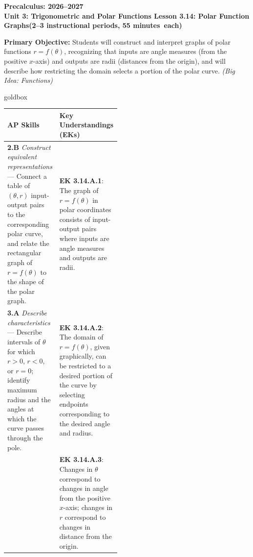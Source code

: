 \documentclass[10pt]{article}
\newcommand{\CourseName}{Precalculus}
\newcommand{\SchoolYear}{2026--2027}
\newcommand{\MeetingLength}{55 minutes}
\newcommand{\UnitNumberName}{Unit 3: Trigonometric and Polar Functions \quad}
\newcommand{\LessonNumberName}{Lesson 3.14: Polar Function Graphs}
\begin{document}
\begin{center}
  {\Large\bfseries \CourseName: \SchoolYear} \\[4pt]
  {\small\bfseries \UnitNumberName \LessonNumberName \quad (2--3 instructional periods, \MeetingLength\ each)}
\end{center}

\begin{tcolorbox}[colback=sky, colframe=navy, boxrule=0.9pt, arc=2mm,
    left=2mm, right=2mm, top=1.5mm, bottom=1.5mm]
  \textbf{Primary Objective:} Students will construct and interpret graphs of polar
  functions $r = f(\theta)$, recognizing that inputs are angle measures (from the
  positive $x$-axis) and outputs are radii (distances from the origin), and will
  describe how restricting the domain selects a portion of the polar curve.
  \textit{(Big Idea: Functions)}
\end{tcolorbox}

\vspace{0.08in}

\begin{skillbox}{goldbox}
\begin{tabularx}{\linewidth}{@{} p{0.46\linewidth} X @{}}
\textbf{AP Skills} & \textbf{Key Understandings (EKs)} \\
\midrule
\textbf{2.B} \textit{Construct equivalent representations} ---
  Connect a table of $(\theta, r)$ input-output pairs to the corresponding
  polar curve, and relate the rectangular graph of $r = f(\theta)$ to the
  shape of the polar graph.
&
\textbf{EK 3.14.A.1}: The graph of $r = f(\theta)$ in polar coordinates
consists of input-output pairs where inputs are angle measures and outputs
are radii. \\[4pt]

\textbf{3.A} \textit{Describe characteristics} ---
  Describe intervals of $\theta$ for which $r > 0$, $r < 0$, or $r = 0$;
  identify maximum radius and the angles at which the curve passes through
  the pole.
&
\textbf{EK 3.14.A.2}: The domain of $r = f(\theta)$, given graphically,
can be restricted to a desired portion of the curve by selecting endpoints
corresponding to the desired angle and radius. \\[4pt]

&
\textbf{EK 3.14.A.3}: Changes in $\theta$ correspond to changes in angle
from the positive $x$-axis; changes in $r$ correspond to changes in distance
from the origin. \\
\end{tabularx}
\end{skillbox}
\end{document}
